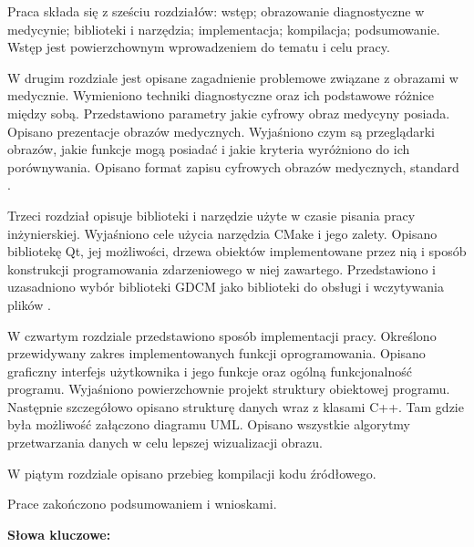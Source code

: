\begin{center}
\large \bf
\thetitle
\end{center}

Praca składa się z sześciu rozdziałów: wstęp; obrazowanie diagnostyczne w medycynie; biblioteki i narzędzia; implementacja; kompilacja; podsumowanie.
Wstęp jest powierzchownym wprowadzeniem do tematu i celu pracy.
\par
W drugim rozdziale jest opisane zagadnienie problemowe związane z obrazami w medycznie.
Wymieniono techniki diagnostyczne oraz ich podstawowe różnice między sobą.
Przedstawiono parametry jakie cyfrowy obraz medycyny posiada.
Opisano prezentacje obrazów medycznych.
Wyjaśniono czym są przeglądarki obrazów, jakie funkcje mogą posiadać i jakie kryteria wyróżniono do ich porównywania.
Opisano format zapisu cyfrowych obrazów medycznych, standard \DICOM.
\par
Trzeci rozdział opisuje biblioteki i narzędzie użyte w czasie pisania pracy inżynierskiej.
Wyjaśniono cele użycia narzędzia CMake i jego zalety.
Opisano bibliotekę Qt, jej możliwości, drzewa obiektów implementowane przez nią i sposób konstrukcji programowania zdarzeniowego w niej zawartego.
Przedstawiono i uzasadniono wybór biblioteki GDCM jako biblioteki do obsługi i wczytywania plików \DICOM.
\par
W czwartym rozdziale przedstawiono sposób implementacji pracy.
Określono przewidywany zakres implementowanych funkcji oprogramowania.
Opisano graficzny interfejs użytkownika i jego funkcje oraz ogólną funkcjonalność programu.
Wyjaśniono powierzchownie projekt struktury obiektowej programu.
Następnie szczegółowo opisano strukturę danych wraz z klasami C++.
Tam gdzie była możliwość załączono diagramu UML.
Opisano wszystkie algorytmy przetwarzania danych w celu lepszej wizualizacji obrazu.
\par
W piątym rozdziale opisano przebieg kompilacji kodu źródłowego.
\par
Prace zakończono podsumowaniem i wnioskami.

\bigskip
{\noindent\bf Słowa kluczowe:} \keywords

\vfill